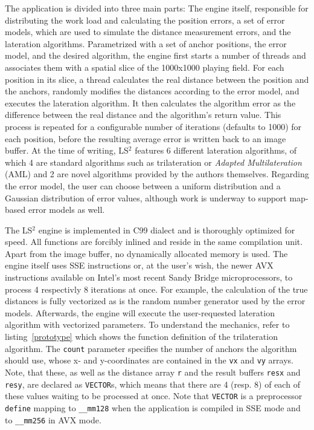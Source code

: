 The application is divided into three main parts: The engine itself, responsible for distributing the work load and calculating the position errors, a set of error models, which are used to simulate the distance measurement errors, and the lateration algorithms. Parametrized with a set of anchor positions, the error model, and the desired algorithm, the engine first starts a number of threads and associates them with a spatial slice of the 1000x1000 playing field. For each position in its slice, a thread calculates the real distance between the position and the anchors, randomly modifies the distances according to the error model, and executes the lateration algorithm. It then calculates the algorithm error as the difference between the real distance and the algorithm's return value. This process is repeated for a configurable number of iterations (defaults to 1000) for each position, before the resulting average error is written back to an image buffer. At the time of writing, LS$^{2}$ features 6 different lateration algorithms, of which 4 are standard algorithms such as trilateration or \emph{Adapted Multilateration} (AML) and 2 are novel algorithms provided by the authors themselves. Regarding the error model, the user can choose between a uniform distribution and a Gaussian distribution of error values, although work is underway to support map-based error models as well.

The LS$^{2}$ engine is implemented in C99 dialect and is thoroughly optimized for speed. All functions are forcibly inlined and reside in the same compilation unit. Apart from the image buffer, no dynamically allocated memory is used. The engine itself uses SSE instructions or, at the user's wish, the newer AVX instructions available on Intel's most recent Sandy Bridge microprocessors, to process 4 respectivly 8 iterations at once. For example, the calculation of the true distances is fully vectorized as is the random number generator used by the error models. Afterwards, the engine will execute the user-requested lateration algorithm with vectorized parameters. To understand the mechanics, refer to listing~\ref{prototype} which shows the function definition of the trilateration algorithm. The \texttt{count} parameter specifies the number of anchors the algorithm should use, whose x- and y-coordinates are contained in the \texttt{vx} and \texttt{vy} arrays. Note, that these, as well as the distance array \texttt{r} and the result buffers \texttt{resx} and \texttt{resy}, are declared as \texttt{VECTOR}s, which means that there are 4 (resp. 8) of each of these values waiting to be processed at once. Note that \texttt{VECTOR} is a preprocessor \texttt{define} mapping to \texttt{\_\_mm128} when the application is compiled in SSE mode and to \texttt{\_\_mm256} in AVX mode.

